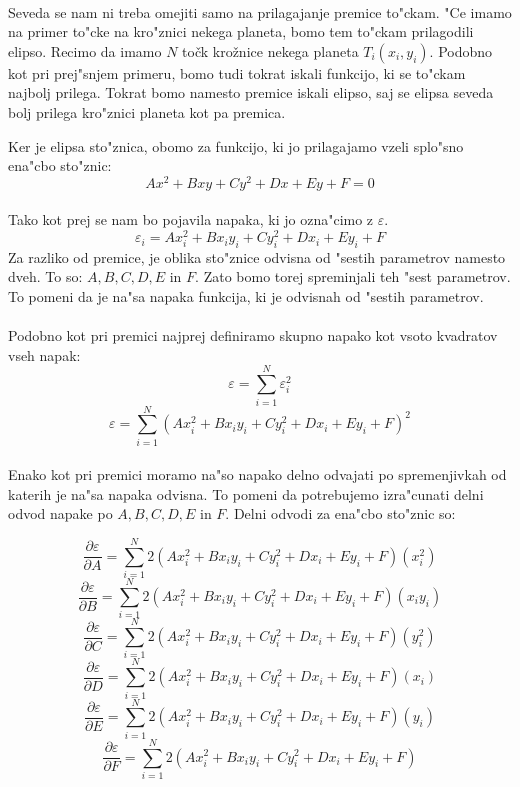 \paragraph{}
Seveda se nam ni treba omejiti samo na prilagajanje premice to"ckam. "Ce imamo na primer to"cke na kro"znici nekega planeta, bomo tem to"ckam prilagodili elipso. Recimo da imamo $N$ točk krožnice nekega planeta $T_i(x_i, y_i)$. Podobno kot pri prej"snjem primeru, bomo tudi tokrat iskali funkcijo, ki se to"ckam najbolj prilega. Tokrat bomo namesto premice iskali elipso, saj se elipsa seveda bolj prilega kro"znici planeta kot pa premica.

Ker je elipsa sto"znica, obomo za funkcijo, ki jo prilagajamo vzeli splo"sno ena"cbo sto"znic:
$$Ax^2 + Bxy + Cy^2 + Dx + Ey + F = 0$$

\paragraph{}
Tako kot prej se nam bo pojavila napaka, ki jo ozna"cimo z $\varepsilon$.
$$\varepsilon_i = Ax_i^2 + Bx_iy_i + Cy_i^2 + Dx_i + Ey_i + F$$
Za razliko od premice, je oblika sto"znice odvisna od "sestih parametrov namesto dveh. To so: $A, B, C, D, E$ in $F$. Zato bomo torej spreminjali teh "sest parametrov. To pomeni da je na"sa napaka funkcija, ki je odvisnah od "sestih parametrov.

\paragraph{}
Podobno kot pri premici najprej definiramo skupno napako kot vsoto kvadratov vseh napak:
\[\varepsilon = \sum_{i=1}^{N}\varepsilon_i^2\]
\[\varepsilon = \sum_{i=1}^{N} (Ax_i^2 + Bx_iy_i + Cy_i^2 + Dx_i + Ey_i + F)^2\]

\paragraph{}
Enako kot pri premici moramo na"so napako delno odvajati po spremenjivkah od katerih je na"sa napaka odvisna. To pomeni da potrebujemo izra"cunati delni odvod napake po $A, B, C, D, E$ in $F$. Delni odvodi za ena"cbo sto"znic so:

$$\frac{\partial \varepsilon}{\partial A} = \sum_{i=1}^{N}2(Ax_i^2 + Bx_iy_i + Cy_i^2 + Dx_i + Ey_i + F)(x_i^2)$$
$$\frac{\partial \varepsilon}{\partial B} = \sum_{i=1}^{N}2(Ax_i^2 + Bx_iy_i + Cy_i^2 + Dx_i + Ey_i + F)(x_iy_i)$$
$$\frac{\partial \varepsilon}{\partial C} = \sum_{i=1}^{N}2(Ax_i^2 + Bx_iy_i + Cy_i^2 + Dx_i + Ey_i + F)(y_i^2)$$
$$\frac{\partial \varepsilon}{\partial D} = \sum_{i=1}^{N}2(Ax_i^2 + Bx_iy_i + Cy_i^2 + Dx_i + Ey_i + F)(x_i)$$
$$\frac{\partial \varepsilon}{\partial E} = \sum_{i=1}^{N}2(Ax_i^2 + Bx_iy_i + Cy_i^2 + Dx_i + Ey_i + F)(y_i)$$
$$\frac{\partial \varepsilon}{\partial F} = \sum_{i=1}^{N}2(Ax_i^2 + Bx_iy_i + Cy_i^2 + Dx_i + Ey_i + F)$$

